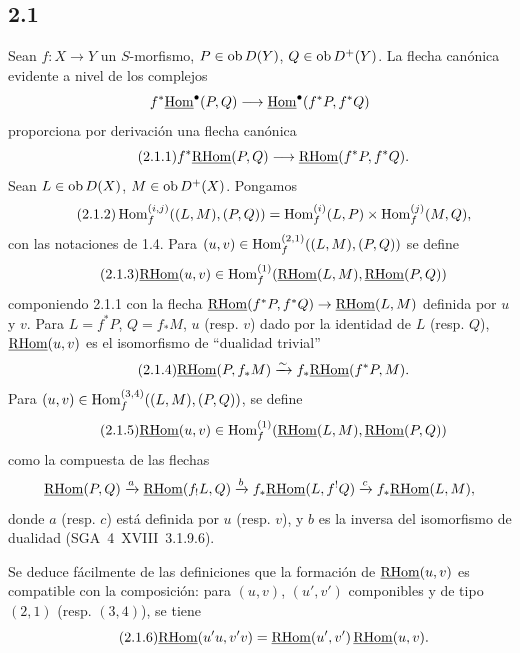 \subsection*{2.1}
Sean $f:X\to Y$ un $S$-morfismo, $P\in\operatorname{ob} D(Y)$, $Q\in\operatorname{ob} D^{+}(Y)$. La flecha canónica evidente a nivel de los complejos
\[
f^{*}\underline{\operatorname{Hom}}^{\bullet}(P,Q)\longrightarrow\underline{\operatorname{Hom}}^{\bullet}(f^{*}P,f^{*}Q)
\]
proporciona por derivación una flecha canónica
\begin{equation}\tag{2.1.1}
f^{*}\underline{\mathrm{RHom}}(P,Q)\longrightarrow\underline{\mathrm{RHom}}(f^{*}P,f^{*}Q).
\end{equation}
Sean $L\in\operatorname{ob} D(X)$, $M\in\operatorname{ob} D^{+}(X)$. Pongamos
\begin{equation}\tag{2.1.2}
\operatorname{Hom}_f^{(i,j)}((L,M),(P,Q))=\operatorname{Hom}_f^{(i)}(L,P)\times\operatorname{Hom}_f^{(j)}(M,Q),
\end{equation}
con las notaciones de 1.4. Para $(u,v)\in\operatorname{Hom}_f^{(2,1)}((L,M),(P,Q))$ se define
\begin{equation}\tag{2.1.3}
\underline{\mathrm{RHom}}(u,v)\in\operatorname{Hom}_f^{(1)}(\underline{\mathrm{RHom}}(L,M),\underline{\mathrm{RHom}}(P,Q))
\end{equation}
componiendo 2.1.1 con la flecha $\underline{\mathrm{RHom}}(f^{*}P,f^{*}Q)\to\underline{\mathrm{RHom}}(L,M)$ definida por $u$ y $v$. Para $L=f^{*}P$, $Q=f_{*}M$, $u$ (resp. $v$) dado por la identidad de $L$ (resp. $Q$), $\underline{\mathrm{RHom}}(u,v)$ es el isomorfismo de ``dualidad trivial''
\begin{equation}\tag{2.1.4}
\underline{\mathrm{RHom}}(P,f_{*}M)\xrightarrow{\sim}f_{*}\underline{\mathrm{RHom}}(f^{*}P,M).
\end{equation}
Para $(u,v)\in\operatorname{Hom}_f^{(3,4)}((L,M),(P,Q))$, se define
\begin{equation}\tag{2.1.5}
\underline{\mathrm{RHom}}(u,v)\in\operatorname{Hom}_f^{(1)}(\underline{\mathrm{RHom}}(L,M),\underline{\mathrm{RHom}}(P,Q))
\end{equation}
como la compuesta de las flechas
\[
\underline{\mathrm{RHom}}(P,Q)\xrightarrow{a}\underline{\mathrm{RHom}}(f_{!}L,Q)\xrightarrow{b}f_{*}\underline{\mathrm{RHom}}(L,f^{!}Q)\xrightarrow{c}f_{*}\underline{\mathrm{RHom}}(L,M),
\]
donde $a$ (resp. $c$) está definida por $u$ (resp. $v$), y $b$ es la inversa del isomorfismo de dualidad (SGA~4~XVIII~3.1.9.6).

Se deduce fácilmente de las definiciones que la formación de $\underline{\mathrm{RHom}}(u,v)$ es compatible con la composición: para $(u,v)$, $(u',v')$ componibles y de tipo $(2,1)$ (resp. $(3,4)$), se tiene
\begin{equation}\tag{2.1.6}
\underline{\mathrm{RHom}}(u'u,v'v)=\underline{\mathrm{RHom}}(u',v')\,\underline{\mathrm{RHom}}(u,v).
\end{equation}

